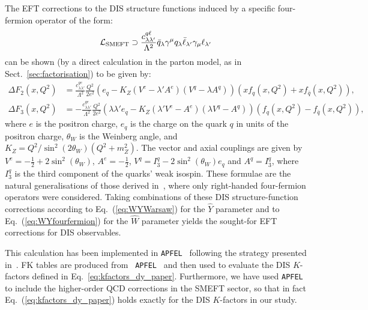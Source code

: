 \documentclass[withindex,glossary]{cam-thesis}
\begin{document}
The EFT corrections to the DIS structure functions induced by a specific four-fermion operator of the form:
\begin{equation}
\mathcal{L}_{\rm SMEFT} \supset \frac{c_{\lambda\lambda'}^{q\ell}}{\Lambda^2} \bar{q}_{\lambda} \gamma^{\mu} q_{\lambda} \bar{\ell}_{\lambda'} \gamma_{\mu} \ell_{\lambda'}
\end{equation}
can be shown (by a direct calculation in the parton model, as in Sect.~\ref{sec:factorisation}) to be given by:
\begin{align}
\Delta F_2(x,Q^2) &=  \frac{c_{\lambda\lambda'}^{qe}}{\Lambda^2}  \frac{Q^2  }{2e^2} \left( e_q - K_Z \left(V^e - \lambda' A^e\right)\left( V^q - \lambda A^q \right)  \right) \left( xf_q(x,Q^2) + xf_{\bar{q}}(x,Q^2) \right), \nonumber\\[1.5ex]
\Delta F_3(x,Q^2) &=-  \frac{c_{\lambda\lambda'}^{qe}}{\Lambda^2} \frac{Q^2}{2e^2} \left( \lambda \lambda' e_q - K_Z \left( \lambda' V^e - A^e \right) \left( \lambda V^q - A^q \right)\right) \left( f_q(x,Q^2) - f_{\bar{q}}(x,Q^2) \right),\nonumber
\end{align}
where $e$ is the positron charge, $e_q$ is the charge on the quark $q$ in units of the positron charge, $\theta_W$ is the Weinberg angle, and $K_Z = Q^2/\sin^2(2\theta_W)(Q^2 + m_Z^2).$
The vector and axial couplings are given by $V^e = -\frac{1}{2} +
2\sin^2(\theta_W)$, $A^e = -\frac{1}{2}$, $V^q = I_3^q -
2\sin^2(\theta_W)e_q$ and $A^q = I^q_3$,
where $I_3^q$ is the third
component of the quarks' weak isospin. These formulae are the natural
generalisations of those derived in~\cite{Carrazza:2019sec}, where only right-handed four-fermion
operators were considered.
%
Taking combinations of these DIS structure-function corrections according to
Eq.~(\ref{eq:WYWarsaw}) for the $\hat{Y}$ parameter and to Eq.~(\ref{eq:WYfourfermion}) for the $\hat{W}$ parameter
yields the sought-for EFT corrections for DIS observables.

This calculation has been implemented in {\tt APFEL}~\cite{Bertone_2014} following the strategy 
presented in~\cite{Carrazza:2019sec}. FK tables are produced from {\tt
  APFEL}~\cite{Bertone:2016lga} and then used to evaluate the DIS $K$-factors
defined in Eq.~\eqref{eq:kfactors_dy_paper}. Furthermore, we have used {\tt APFEL} to
include the higher-order QCD corrections in the SMEFT sector, so that in fact Eq.~(\ref{eq:kfactors_dy_paper})
holds exactly for the DIS $K$-factors in our study.
\end{document}
